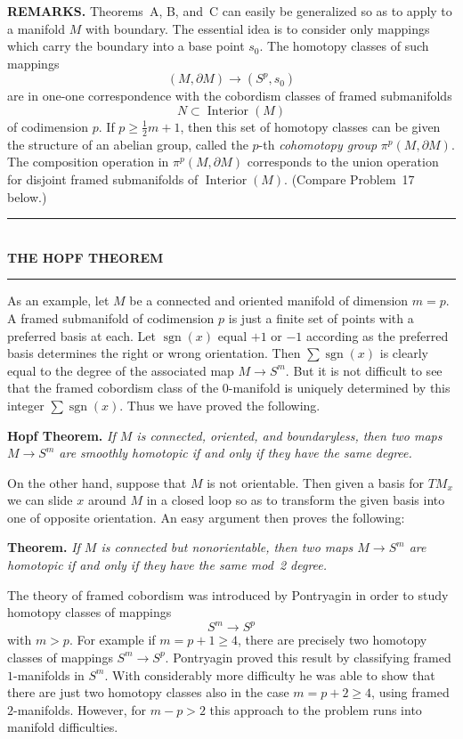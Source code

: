 \noindent\textbf{REMARKS.} Theorems~A, B, and~C can easily be generalized so as to apply to a manifold $M$ with boundary. The essential idea is to consider only mappings which carry the boundary into a base point $s_0$. The homotopy classes of such mappings
\[
(M, \partial M) \to (S^p, s_0)
\]
are in one-one correspondence with the cobordism classes of framed submanifolds
\[
N \subset \operatorname{Interior}(M)
\]
of codimension $p$. If $p \ge \frac{1}{2} m + 1$, then this set of homotopy classes can be given the structure of an abelian group, called the $p$-th \emph{cohomotopy group} $\pi^p(M, \partial M)$. The composition operation in $\pi^p(M, \partial M)$ corresponds to the union operation for disjoint framed submanifolds of $\operatorname{Interior}(M)$. (Compare Problem~17 below.)

\begin{center}
\rule{0.8\textwidth}{0.4pt}\\[0.6em]
{\large\bfseries THE HOPF THEOREM}\\[0.6em]
\rule{0.8\textwidth}{0.4pt}
\end{center}

As an example, let $M$ be a connected and oriented manifold of dimension $m = p$. A framed submanifold of codimension $p$ is just a finite set of points with a preferred basis at each. Let $\operatorname{sgn}(x)$ equal $+1$ or $-1$ according as the preferred basis determines the right or wrong orientation. Then $\sum \operatorname{sgn}(x)$ is clearly equal to the degree of the associated map $M \to S^m$. But it is not difficult to see that the framed cobordism class of the $0$-manifold is uniquely determined by this integer $\sum \operatorname{sgn}(x)$. Thus we have proved the following.




\noindent\textbf{Hopf Theorem.} \textit{If $M$ is connected, oriented, and boundaryless, then two maps $M \to S^m$ are smoothly homotopic if and only if they have the same degree.}

On the other hand, suppose that $M$ is not orientable. Then given a basis for $TM_x$ we can slide $x$ around $M$ in a closed loop so as to transform the given basis into one of opposite orientation. An easy argument then proves the following:

\noindent\textbf{Theorem.} \textit{If $M$ is connected but nonorientable, then two maps $M \to S^m$ are homotopic if and only if they have the same mod~2 degree.}

The theory of framed cobordism was introduced by Pontryagin in order to study homotopy classes of mappings
\[
S^m \to S^p
\]
with $m > p$. For example if $m = p + 1 \ge 4$, there are precisely two homotopy classes of mappings $S^m \to S^p$. Pontryagin proved this result by classifying framed $1$-manifolds in $S^m$. With considerably more difficulty he was able to show that there are just two homotopy classes also in the case $m = p + 2 \ge 4$, using framed $2$-manifolds. However, for $m - p > 2$ this approach to the problem runs into manifold difficulties.

